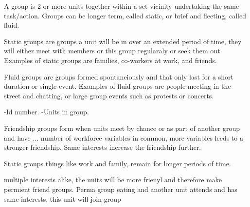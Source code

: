 





A group is 2 or more units together within a set vicinity undertaking the same task/action. Groups can be longer term, called static, or brief and fleeting, called fluid.

Static groups are groups a unit will be in over an extended period of time, they will either meet with members or this group regularaly or seek them out. Examples of static groups are families, co-workers at work, and friends. 

Fluid groups are groups formed spontaneiously and that only last for a short duration or single event. Examples of fluid groups are people meeting in the street and chatting, or large group events such as protests or concerts.


-Id number.
-Units in group.



Friendship groups form when units meet by chance or as part of another group and have ... number of workforce variables in common, more variables leeds to a stronger friendship. Same interests increase the friendship further. 







Static groups things like work and family, remain for longer periods of time.

multiple interests alike, the units will be more frienyl and therefore make permient friend groups.
Perma group eating and another unit attends and has same interests, this unit will join group

